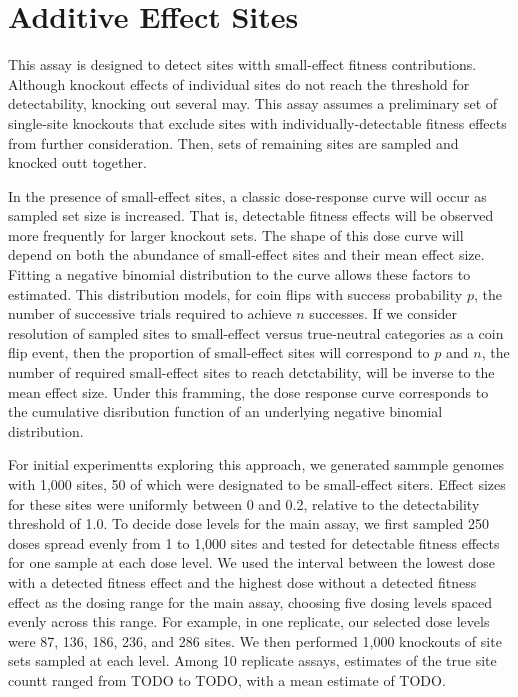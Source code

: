 \section{Additive Effect Sites}

This assay is designed to detect sites witth small-effect fitness contributions.
Although knockout effects of individual sites do not reach the threshold for detectability, knocking out several may.
This assay assumes a preliminary set of single-site knockouts that exclude sites with individually-detectable fitness effects from further consideration.
Then, sets of remaining sites are sampled and knocked outt together.

In the presence of small-effect sites, a classic dose-response curve will occur as sampled set size is increased.
That is, detectable fitness effects will be observed more frequently for larger knockout sets.
The shape of this dose curve will depend on both the abundance of small-effect sites and their mean effect size.
Fitting a negative binomial distribution to the curve allows these factors to estimated.
This distribution models, for coin flips with success probability $p$, the number of successive trials required to achieve $n$ successes.
If we consider resolution of sampled sites to small-effect versus true-neutral categories as a coin flip event, then the proportion of small-effect sites will correspond to $p$ and $n$, the number of required small-effect sites to reach detctability, will be inverse to the mean effect size.
Under this framming, the dose response curve corresponds to the cumulative disribution function of an underlying negative binomial distribution.

For initial experimentts exploring this approach, we generated sammple genomes with 1,000 sites, 50 of which were designated to be small-effect siters.
Effect sizes for these sites were uniformly between 0 and 0.2, relative to the detectability threshold of 1.0.
To decide dose levels for the main assay, we first sampled 250 doses spread evenly from 1 to 1,000 sites and tested for detectable fitness effects for one sample at each dose level.
We used the interval between the lowest dose with a detected fitness effect and the highest dose without a detected fitness effect as the dosing range for the main assay, choosing five dosing levels spaced evenly across this range.
For example, in one replicate, our selected dose levels were 87, 136, 186, 236, and 286 sites.
We then performed 1,000 knockouts of site sets sampled at each level.
Among 10 replicate assays, estimates of the true site countt ranged from TODO to TODO, with a mean estimate of TODO.


